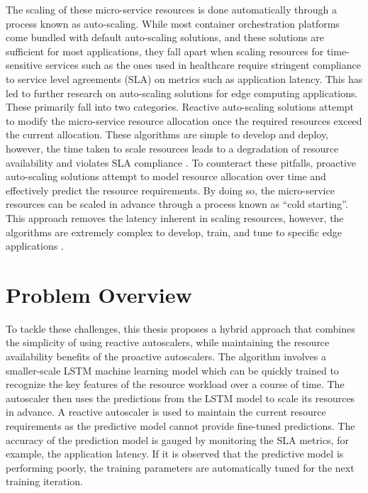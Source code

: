 The scaling of these micro-service resources is done automatically through a process known as auto-scaling. While most container orchestration platforms come bundled with default auto-scaling solutions, and these solutions are sufficient for most applications, they fall apart when scaling resources for time-sensitive services such as the ones used in healthcare require stringent compliance to service level agreements (SLA) on metrics such as application latency. This has led to further research on auto-scaling solutions for edge computing applications. These primarily fall into two categories. Reactive auto-scaling solutions attempt to modify the micro-service resource allocation once the required resources exceed the current allocation. These algorithms are simple to develop and deploy, however, the time taken to scale resources leads to a degradation of resource availability and violates SLA compliance \cite{podolskiy2018iaas}. To counteract these pitfalls, proactive auto-scaling solutions attempt to model resource allocation over time and effectively predict the resource requirements. By doing so, the micro-service resources can be scaled in advance through a process known as ``cold starting''. This approach removes the latency inherent in scaling resources, however, the algorithms are extremely complex to develop, train, and tune to specific edge applications \cite{straesser2022not}.

\section{Problem Overview}
\label{sec:problem-overview}

To tackle these challenges, this thesis proposes a hybrid approach that combines the simplicity of using reactive autoscalers, while maintaining the resource availability benefits of the proactive autoscalers. The algorithm involves a smaller-scale LSTM machine learning model which can be quickly trained to recognize the key features of the resource workload over a course of time. The autoscaler then uses the predictions from the LSTM model to scale its resources in advance. A reactive autoscaler is used to maintain the current resource requirements as the predictive model cannot provide fine-tuned predictions. The accuracy of the prediction model is gauged by monitoring the SLA metrics, for example, the application latency. If it is observed that the predictive model is performing poorly, the training parameters are automatically tuned for the next training iteration.\par

